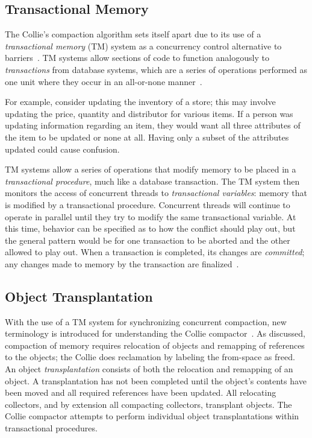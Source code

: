 \documentclass{sig-alternate}
\begin{document}
\subsection{Transactional Memory}
\label{sec:collieTM}
The Collie's compaction algorithm sets itself apart due to its use 
of a \emph{transactional memory} (TM) system as a concurrency control 
alternative to barriers~\cite{Iyengar:Collie}. TM systems allow
sections of code to function 
analogously to \emph{transactions} from database systems, 
which are a series of operations performed as one unit where 
they occur in an all-or-none manner~\cite{wiki:atomicity}.

For example, consider updating the inventory of a store; this may involve updating
the price, quantity and distributor for various items. 
If a person was updating information regarding an item, they would 
want all three attributes of the item to be updated or none at all. Having
only a subset of the attributes updated could cause confusion.

TM systems allow a series
of operations that modify memory to be placed in
a \emph{transactional procedure}, much like a database transaction.
The TM system then monitors the access of concurrent threads to \emph{transactional variables}:
memory that is modified by a transactional procedure.
Concurrent threads will continue to operate in parallel until they try to modify
the same transactional variable. At this time, behavior can be specified as to how 
the conflict should play out, but the general pattern would be for one transaction
to be aborted and the other allowed to play out.
When a transaction is completed, its changes are \emph{committed}; any changes 
made to memory by the transaction are finalized~\cite{wiki:transactional-memory}.


\subsection{Object Transplantation}
\label{sec:collieTransplantation}

With the use of a TM system for synchronizing concurrent compaction,
new terminology is introduced for understanding the Collie 
compactor~\cite{Iyengar:Collie}. As discussed, compaction of
memory requires relocation of objects and remapping of references to
the objects; the Collie does reclamation by labeling the from-space as freed.
An object \emph{transplantation} consists of both the relocation and 
remapping of an object. A transplantation has not been completed until
the object's contents have been moved and all required references have been
updated. All relocating collectors, and by extension all
compacting collectors, transplant objects. The Collie compactor attempts to 
perform individual object transplantations within transactional procedures. 
\end{document}
